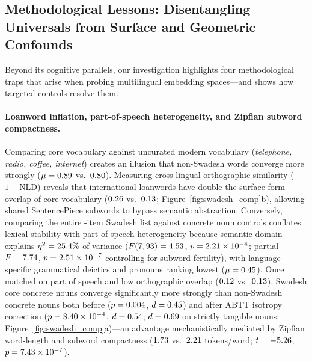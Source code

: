 \subsection{Methodological Lessons: Disentangling Universals from Surface and Geometric Confounds}

Beyond its cognitive parallels, our investigation highlights four methodological traps that arise when probing multilingual embedding spaces—and shows how targeted controls resolve them.

\paragraph{Loanword inflation, part-of-speech heterogeneity, and Zipfian subword compactness.}
Comparing core vocabulary against uncurated modern vocabulary (\emph{telephone, radio, coffee, internet}) creates an illusion that non-Swadesh words converge more strongly ($\mu = 0.89{}$ vs.\ $0.80{}$).
Measuring cross-lingual orthographic similarity ($1 - \text{NLD}$) reveals that international loanwords have double the surface-form overlap of core vocabulary ($0.26{}$ vs.\ $0.13{}$; Figure~\ref{fig:swadesh_comp}b), allowing shared SentencePiece subwords to bypass semantic abstraction.
Conversely, comparing the entire \NumConcepts{}-item Swadesh list against concrete noun controls conflates lexical stability with part-of-speech heterogeneity because semantic domain explains $\eta^2 = 25.4{}\%$ of variance ($F(7,93) = 4.53{}$, $p = 2.21 \times 10^{-4}{}$; partial $F = 7.74{}$, $p = 2.51 \times 10^{-7}{}$ controlling for subword fertility), with language-specific grammatical deictics and pronouns ranking lowest ($\mu = 0.45{}$).
Once matched on part of speech and low orthographic overlap ($0.12{}$ vs.\ $0.13{}$), Swadesh core concrete nouns converge significantly more strongly than non-Swadesh concrete nouns both before ($p = 0.004{}$, $d = 0.45{}$) and after ABTT isotropy correction ($p = 8.40 \times 10^{-4}{}$, $d = 0.54{}$; $d = 0.69{}$ on strictly tangible nouns; Figure~\ref{fig:swadesh_comp}a)—an advantage mechanistically mediated by Zipfian word-length and subword compactness ($1.73{}$ vs.\ $2.21{}$ tokens/word; $t = -5.26{}$, $p = 7.43 \times 10^{-7}{}$).

